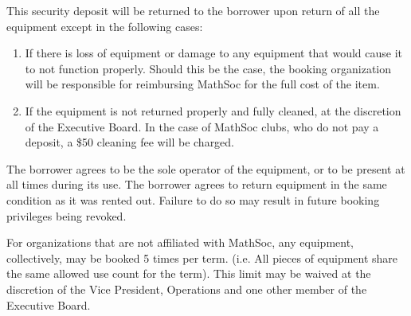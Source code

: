 This security deposit will be returned to the borrower upon return of all the
equipment except in the following cases:

\begin{enumerate}
  \item If there is loss of equipment or damage to any equipment that would cause it to not function
    properly. Should this be the case, the booking organization will be
    responsible for reimbursing MathSoc for the full cost of the item.
  \item If the equipment is not returned properly and fully cleaned, at the
    discretion of the Executive Board. In the case of MathSoc clubs, who do not
   pay a deposit, a \$50 cleaning fee will be charged.
\end{enumerate}

The borrower agrees to be the sole operator of the equipment, or to be present
at all times during its use. The borrower agrees to return equipment in the same condition as it was rented out. Failure to do so may result in future booking privileges being revoked.

For organizations that are not affiliated with MathSoc, any equipment,
collectively, may be booked 5 times per term. (i.e. All pieces of equipment
share the same allowed use count for the term). This limit may be waived at the
discretion of the Vice President, Operations and one other member of the
Executive Board.

